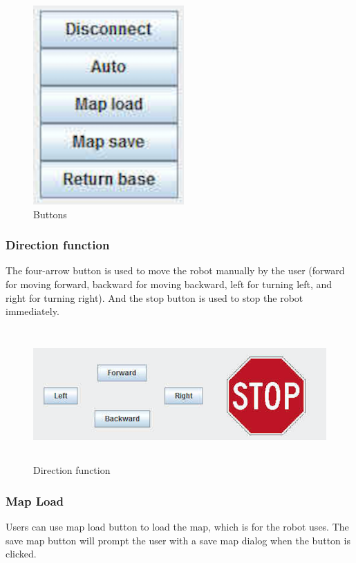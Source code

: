 \documentclass[11pt, a4paper]{article}
\begin{document}
\begin{figure}[H]
\centering
\includegraphics[height=3in]{buttons}
\caption[Buttons]{Buttons}
\end{figure}

\subsubsection{Direction function}
The four-arrow button is used to move the robot manually by the user (forward for moving forward, backward for moving backward, left for turning left, and right for turning right). And the stop button is used to stop the robot immediately.

\begin{figure}[H]
\centering
\includegraphics[height=2in]{auto}
\caption[Direction function]{Direction function}
\end{figure}
\newpage

\subsubsection{Map Load}
Users can use map load button to load the map, which is for the robot uses. The save map button will prompt the user with a save map dialog when the button is clicked.
\end{document}
